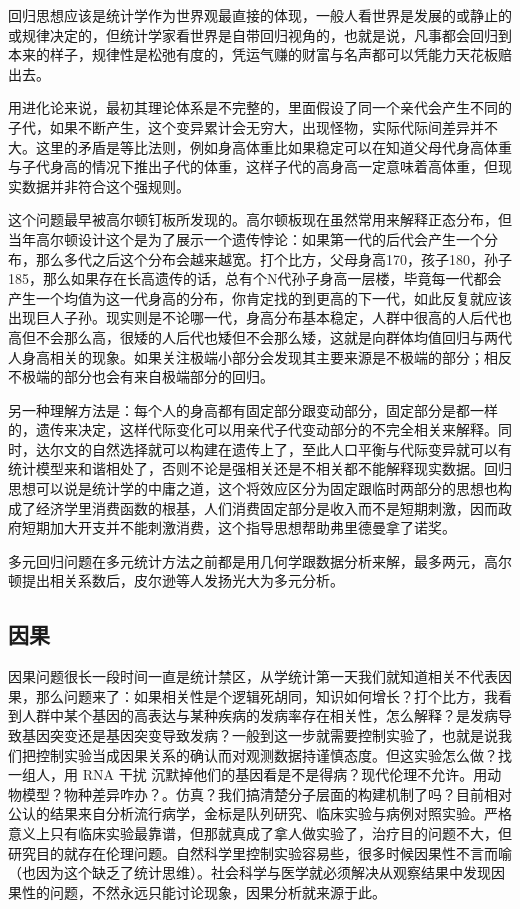 \documentclass[]{tufte-book}
\begin{document}
回归思想应该是统计学作为世界观最直接的体现，一般人看世界是发展的或静止的或规律决定的，但统计学家看世界是自带回归视角的，也就是说，凡事都会回归到本来的样子，规律性是松弛有度的，凭运气赚的财富与名声都可以凭能力天花板赔出去。

用进化论来说，最初其理论体系是不完整的，里面假设了同一个亲代会产生不同的子代，如果不断产生，这个变异累计会无穷大，出现怪物，实际代际间差异并不大。这里的矛盾是等比法则，例如身高体重比如果稳定可以在知道父母代身高体重与子代身高的情况下推出子代的体重，这样子代的高身高一定意味着高体重，但现实数据并非符合这个强规则。

这个问题最早被高尔顿钉板所发现的。高尔顿板现在虽然常用来解释正态分布，但当年高尔顿设计这个是为了展示一个遗传悖论：如果第一代的后代会产生一个分布，那么多代之后这个分布会越来越宽。打个比方，父母身高170，孩子180，孙子185，那么如果存在长高遗传的话，总有个N代孙子身高一层楼，毕竟每一代都会产生一个均值为这一代身高的分布，你肯定找的到更高的下一代，如此反复就应该出现巨人子孙。现实则是不论哪一代，身高分布基本稳定，人群中很高的人后代也高但不会那么高，很矮的人后代也矮但不会那么矮，这就是向群体均值回归与两代人身高相关的现象。如果关注极端小部分会发现其主要来源是不极端的部分；相反不极端的部分也会有来自极端部分的回归。

另一种理解方法是：每个人的身高都有固定部分跟变动部分，固定部分是都一样的，遗传来决定，这样代际变化可以用亲代子代变动部分的不完全相关来解释。同时，达尔文的自然选择就可以构建在遗传上了，至此人口平衡与代际变异就可以有统计模型来和谐相处了，否则不论是强相关还是不相关都不能解释现实数据。回归思想可以说是统计学的中庸之道，这个将效应区分为固定跟临时两部分的思想也构成了经济学里消费函数的根基，人们消费固定部分是收入而不是短期刺激，因而政府短期加大开支并不能刺激消费，这个指导思想帮助弗里德曼拿了诺奖。

多元回归问题在多元统计方法之前都是用几何学跟数据分析来解，最多两元，高尔顿提出相关系数后，皮尔逊等人发扬光大为多元分析。

\hypertarget{ux56e0ux679c}{%
\subsection{因果}\label{ux56e0ux679c}}

因果问题很长一段时间一直是统计禁区，从学统计第一天我们就知道相关不代表因果，那么问题来了：如果相关性是个逻辑死胡同，知识如何增长？打个比方，我看到人群中某个基因的高表达与某种疾病的发病率存在相关性，怎么解释？是发病导致基因突变还是基因突变导致发病？一般到这一步就需要控制实验了，也就是说我们把控制实验当成因果关系的确认而对观测数据持谨慎态度。但这实验怎么做？找一组人，用 RNA 干扰 沉默掉他们的基因看是不是得病？现代伦理不允许。用动物模型？物种差异咋办？。仿真？我们搞清楚分子层面的构建机制了吗？目前相对公认的结果来自分析流行病学，金标是队列研究、临床实验与病例对照实验。严格意义上只有临床实验最靠谱，但那就真成了拿人做实验了，治疗目的问题不大，但研究目的就存在伦理问题。自然科学里控制实验容易些，很多时候因果性不言而喻（也因为这个缺乏了统计思维）。社会科学与医学就必须解决从观察结果中发现因果性的问题，不然永远只能讨论现象，因果分析就来源于此。
\end{document}
